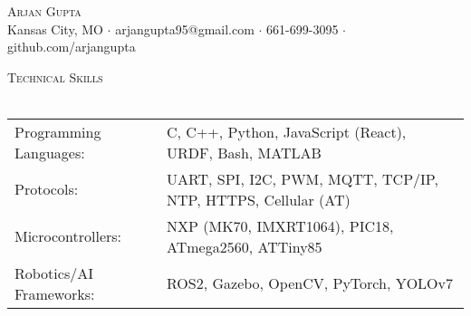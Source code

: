 \documentclass[a4paper]{article}
\newcommand{\lineunder} {
    \vspace*{-8pt} \\
    \hspace*{-18pt} \hrulefill \\
}
\newcommand{\header} [1] {
    {\hspace*{-18pt}\vspace*{6pt} \textsc{#1}}
    \vspace*{-6pt} \lineunder
}
\begin{document}
\vspace*{-40pt}

    

\vspace*{-10pt}
\begin{center}
	{\Huge \scshape {Arjan Gupta}}\\
	Kansas City, MO $\cdot$ arjangupta95@gmail.com $\cdot$ 661-699-3095 $\cdot$ github.com/arjangupta\\
\end{center}

\header{Technical Skills}
\vspace{2mm}
\begin{tabular}{ l l }
	Programming Languages: & C, C++, Python, JavaScript (React), URDF, Bash, MATLAB \\
    Protocols:             & UART, SPI, I2C, PWM, MQTT, TCP/IP, NTP, HTTPS, Cellular (AT) \\
    Microcontrollers:      & NXP (MK70, IMXRT1064), PIC18, ATmega2560, ATTiny85        \\
    Robotics/AI Frameworks:   & ROS2, Gazebo, OpenCV, PyTorch, YOLOv7 \\
\end{tabular}
\vspace{5mm}
\end{document}
